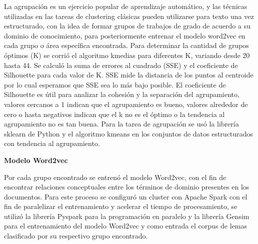 La agrupación es un ejercicio popular de aprendizaje automático, y las técnicas utilizadas en las tareas de clustering clásicas pueden utilizarse para texto una vez estructurado, con la idea de formar grupos de trabajos de grado de acuerdo a su dominio de conocimiento, para posteriormente entrenar el modelo word2vec en cada grupo o área específica encontrada. Para determinar la cantidad de grupos óptimos (K) se corrió el algoritmo kmedias para diferentes K, variando desde 20 hasta 44. Se calculó la suma de errores al cuadrado (SSE) y el coeficiente de Silhouette para cada valor de K. SSE mide la distancia de los puntos al centroide por lo cual esperamos que SSE sea lo más bajo posible. El coeficiente de Silhouette es útil para analizar la cohesión y la separación del agrupamiento, valores cercanos a 1 indican que el agrupamiento es bueno, valores alrededor de cero o hasta negativos indican que el k no es el óptimo o la tendencia al agrupamiento no es tan buena. Para la tarea de agrupación se usó la librería sklearn de Python y el algoritmo kmeans en los conjuntos de datos estructurados con tendencia al agrupamiento. 


%
%

\textbf{Modelo Word2vec}

Por cada grupo encontrado se entrenó el modelo Word2vec, con el fin de encontrar relaciones conceptuales entre los términos de dominio presentes en los documentos. 
Para este proceso se configuró un cluster con Apache Spark con el fin de paralelizar el entrenamiento y acelerar el tiempo de procesamiento, se utilizó la librería Pyspark para la programación en paralelo y la librería Gensim para el entrenamiento del modelo Word2vec y como entrada el corpus de lemas clasificado por su respectivo grupo encontrado.


